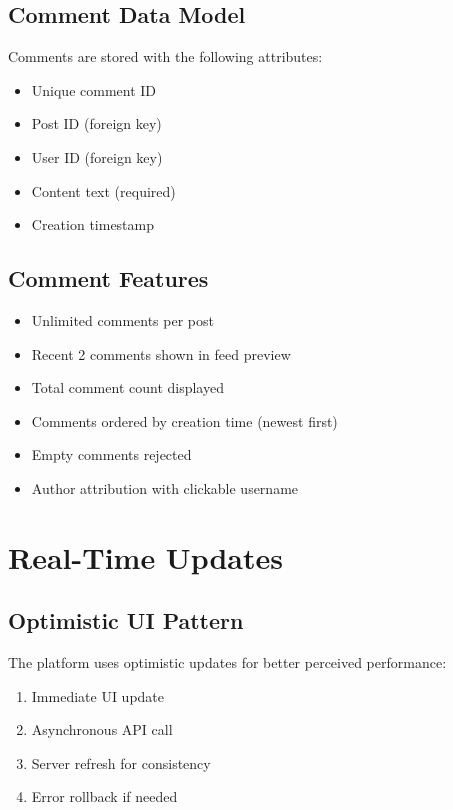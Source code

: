 \documentclass[12pt,a4paper]{report}
\begin{document}
\subsection{Comment Data Model}

Comments are stored with the following attributes:

\begin{itemize}
    \item Unique comment ID
    \item Post ID (foreign key)
    \item User ID (foreign key)
    \item Content text (required)
    \item Creation timestamp
\end{itemize}

\subsection{Comment Features}

\begin{itemize}
    \item Unlimited comments per post
    \item Recent 2 comments shown in feed preview
    \item Total comment count displayed
    \item Comments ordered by creation time (newest first)
    \item Empty comments rejected
    \item Author attribution with clickable username
\end{itemize}

\section{Real-Time Updates}

\subsection{Optimistic UI Pattern}

The platform uses optimistic updates for better perceived performance:

\begin{enumerate}
    \item Immediate UI update
    \item Asynchronous API call
    \item Server refresh for consistency
    \item Error rollback if needed
\end{enumerate}
\end{document}
